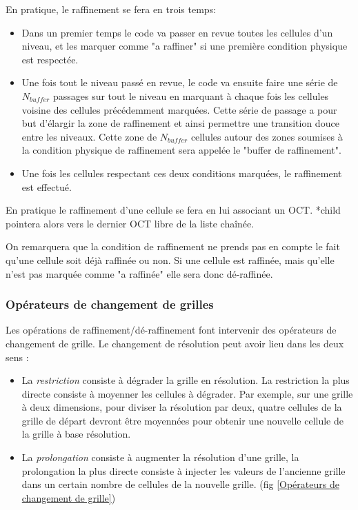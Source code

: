 En pratique, le raffinement se fera en trois temps:

\begin{itemize}
\item Dans un premier temps le code va passer en revue toutes les cellules d'un niveau, et les marquer comme "a raffiner" si une première condition physique est respectée.

\item Une fois tout le niveau passé en revue, le code va ensuite faire une série de $N_{buffer}$ passages sur tout le niveau en marquant à chaque fois les cellules voisine des cellules précédemment marquées.
Cette série de passage a pour but d’élargir la zone de raffinement et ainsi permettre une transition douce entre les niveaux.
Cette zone de $N_{buffer}$ cellules autour des zones soumises à la condition physique de raffinement sera appelée le "buffer de raffinement".

\item Une fois les cellules respectant ces deux conditions marquées, le raffinement est effectué.
\end{itemize}

En pratique le raffinement d'une cellule se fera en lui associant un OCT.
*child pointera alors vers le dernier OCT libre de la liste chaînée.

On remarquera que la condition de raffinement ne prends pas en compte le fait qu'une cellule soit déjà raffinée ou non.
Si une cellule est raffinée, mais qu'elle n'est pas marquée comme "a raffinée" elle sera donc dé-raffinée.

\subsubsection{Opérateurs de changement de grilles} \label{Opérateurs de changement de grilles}

Les opérations de raffinement/dé-raffinement font intervenir des opérateurs de changement de grille.
Le changement de résolution peut avoir lieu dans les deux sens :

\begin{itemize}
\item La \emph{restriction} consiste à dégrader la grille en résolution. La restriction la plus directe consiste à moyenner les cellules à dégrader. Par exemple, sur une grille à deux dimensions, pour diviser la résolution par deux, quatre cellules de la grille de départ devront être moyennées pour obtenir une nouvelle cellule de la grille à base résolution.

\item La \emph{prolongation} consiste à augmenter la résolution d'une grille, la prolongation la plus directe consiste à injecter les valeurs de l'ancienne grille dans un certain nombre de cellules de la nouvelle grille. (fig \ref{Opérateurs de changement de grille})
\end{itemize}

